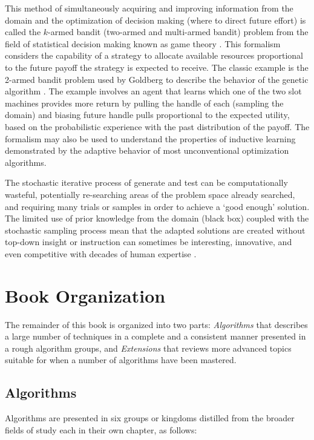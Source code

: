\begin{bibunit}
This method of simultaneously acquiring and improving information from the domain and the optimization of decision making (where to direct future effort) is called the $k$-armed bandit (two-armed and multi-armed bandit) problem from the field of statistical decision making known as game theory \cite{Robbins1952, Bergemann2006}. This formalism considers the capability of a strategy to allocate available resources proportional to the future payoff the strategy is expected to receive. The classic example is the 2-armed bandit problem used by Goldberg to describe the behavior of the genetic algorithm \cite{Goldberg1989}. The example involves an agent that learns which one of the two slot machines provides more return by pulling the handle of each (sampling the domain) and biasing future handle pulls proportional to the expected utility, based on the probabilistic experience with the past distribution of the payoff. The formalism may also be used to understand the properties of inductive learning demonstrated by the adaptive behavior of most unconventional optimization algorithms.

The stochastic iterative process of generate and test can be computationally wasteful, potentially re-searching areas of the problem space already searched, and requiring many trials or samples in order to achieve a `good enough' solution. 
The limited use of prior knowledge from the domain (black box) coupled with the stochastic sampling process mean that the adapted solutions are created without top-down insight or instruction can sometimes be interesting, innovative, and even competitive with decades of human expertise \cite{Koza2003}. 


% 
% 
\section{Book Organization}
\label{intro:sec:organization}
The remainder of this book is organized into two parts: \emph{Algorithms} that describes a large number of techniques in a complete and a consistent manner presented in a rough algorithm groups, and \emph{Extensions} that reviews more advanced topics suitable for when a number of algorithms have been mastered.

% 
%
\subsection{Algorithms}
Algorithms are presented in six groups or kingdoms distilled from the broader fields of study each in their own chapter, as follows: 


\end{bibunit}
